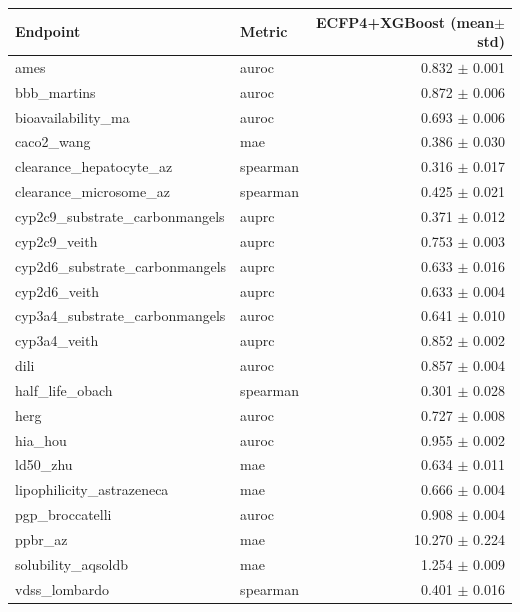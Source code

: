 \begin{tabular}{llr}
\toprule
Endpoint & Metric & ECFP4+XGBoost (mean$\pm$std) \\
\midrule
ames & auroc & 0.832 $\pm$ 0.001 \\
bbb\_martins & auroc & 0.872 $\pm$ 0.006 \\
bioavailability\_ma & auroc & 0.693 $\pm$ 0.006 \\
caco2\_wang & mae & 0.386 $\pm$ 0.030 \\
clearance\_hepatocyte\_az & spearman & 0.316 $\pm$ 0.017 \\
clearance\_microsome\_az & spearman & 0.425 $\pm$ 0.021 \\
cyp2c9\_substrate\_carbonmangels & auprc & 0.371 $\pm$ 0.012 \\
cyp2c9\_veith & auprc & 0.753 $\pm$ 0.003 \\
cyp2d6\_substrate\_carbonmangels & auprc & 0.633 $\pm$ 0.016 \\
cyp2d6\_veith & auprc & 0.633 $\pm$ 0.004 \\
cyp3a4\_substrate\_carbonmangels & auroc & 0.641 $\pm$ 0.010 \\
cyp3a4\_veith & auprc & 0.852 $\pm$ 0.002 \\
dili & auroc & 0.857 $\pm$ 0.004 \\
half\_life\_obach & spearman & 0.301 $\pm$ 0.028 \\
herg & auroc & 0.727 $\pm$ 0.008 \\
hia\_hou & auroc & 0.955 $\pm$ 0.002 \\
ld50\_zhu & mae & 0.634 $\pm$ 0.011 \\
lipophilicity\_astrazeneca & mae & 0.666 $\pm$ 0.004 \\
pgp\_broccatelli & auroc & 0.908 $\pm$ 0.004 \\
ppbr\_az & mae & 10.270 $\pm$ 0.224 \\
solubility\_aqsoldb & mae & 1.254 $\pm$ 0.009 \\
vdss\_lombardo & spearman & 0.401 $\pm$ 0.016 \\
\bottomrule
\end{tabular}
